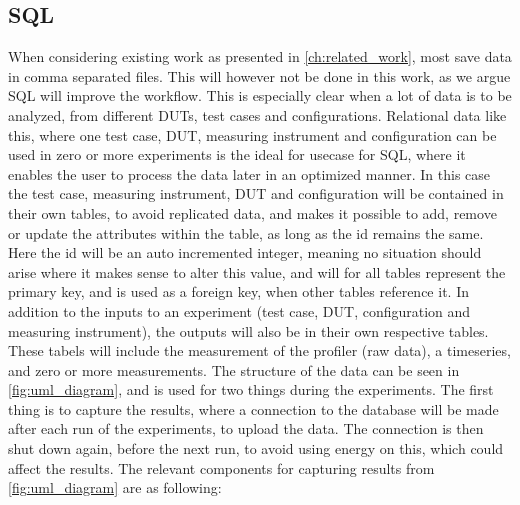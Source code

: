 \subsection{SQL}\label{subsec:sql}

When considering existing work as presented in \cref*{ch:related_work}, most save data in comma separated files\cite*[]{Koedijk2022diff,Pereira2017}. This will however not be done in this work, as we argue SQL will improve the workflow. This is especially clear when a lot of data is to be analyzed, from different DUTs, test cases and configurations. Relational data like this, where one test case, DUT, measuring instrument and configuration can be used in zero or more experiments is the ideal for usecase for SQL, where it enables the user to process the data later in an optimized manner\cite*[]{Silberschatz2019}. In this case the test case, measuring instrument, DUT and configuration will be contained in their own tables, to avoid replicated data, and makes it possible to add, remove or update the attributes within the table, as long as the id remains the same. Here the id will be an auto incremented integer, meaning no situation should arise where it makes sense to alter this value, and will for all tables represent the primary key, and is used as a foreign key, when other tables reference it. In addition to the inputs to an experiment (test case, DUT, configuration and measuring instrument), the outputs will also be in their own respective tables. These tabels will include the measurement of the profiler (raw data), a timeseries, and zero or more measurements. The structure of the data can be seen in \cref{fig:uml_diagram}, and is used for two things during the experiments. The first thing is to capture the results, where a connection to the database will be made after each run of the experiments, to upload the data. The connection is then shut down again, before the next run, to avoid using energy on this, which could affect the results. The relevant components for capturing results from \cref*{fig:uml_diagram} are as following:

